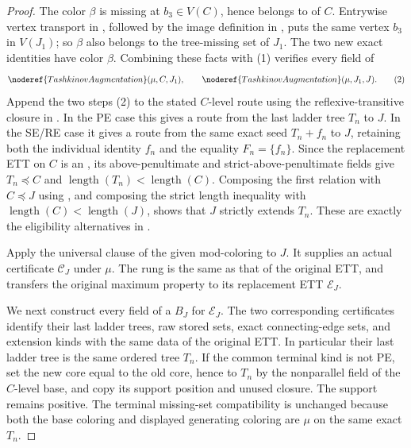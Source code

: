 \begin{proof}
The color $\beta$ is missing at $b_3\in V(C)$, hence belongs to
 of $C$.  Entrywise vertex transport in
, followed by the image definition in
, puts the same vertex $b_3$ in $V(J_1)$;
so $\beta$ also belongs to the tree-missing set of $J_1$.  The two new
exact identities have color $\beta$.  Combining these facts with (1)
verifies every field of
\[
   \noderef{TashkinovAugmentation}(\mu,C,J_1),\qquad
   \noderef{TashkinovAugmentation}(\mu,J_1,J).                \tag{2}
\]
Append the two steps (2) to the stated $C$-level route using the
reflexive-transitive closure in
.  In the PE case this gives a
route from the last ladder tree $T_n$ to $J$.  In the SE/RE case it gives
a route from the same exact seed $T_n+f_n$ to $J$, retaining both the
individual identity $f_n$ and the equality $F_n=\{f_n\}$.  Since the
replacement ETT on $C$ is an , its
above-penultimate and strict-above-penultimate fields give
$T_n\preccurlyeq C$ and
$\operatorname{length}(T_n)<\operatorname{length}(C)$.  Composing the
first relation with $C\preccurlyeq J$ using
, and composing the strict length
inequality with $\operatorname{length}(C)<\operatorname{length}(J)$,
shows that $J$ strictly extends $T_n$.  These are exactly the eligibility
alternatives in .

Apply the universal clause of the given mod-coloring to $J$.  It supplies
an actual  certificate
$\mathcal C_J$ under $\mu$.  The rung is the same as that of the original
ETT, and  transfers the original
maximum property
to its replacement ETT $\mathcal E_J$.

We next construct every field of a  $B_J$ for
$\mathcal E_J$.  The two corresponding certificates identify their last
ladder trees, raw stored sets, exact connecting-edge sets, and extension
kinds with the same data of the original ETT.  In particular their last
ladder tree is the same ordered tree $T_n$.  If the common terminal kind
is not PE, set the new core equal to the old core, hence to $T_n$ by the
nonparallel field of the $C$-level base, and copy its support position and
unused closure.  The support remains positive.  The terminal missing-set
compatibility is unchanged because both the base coloring and displayed
generating coloring are $\mu$ on the same exact $T_n$.


\end{proof}
